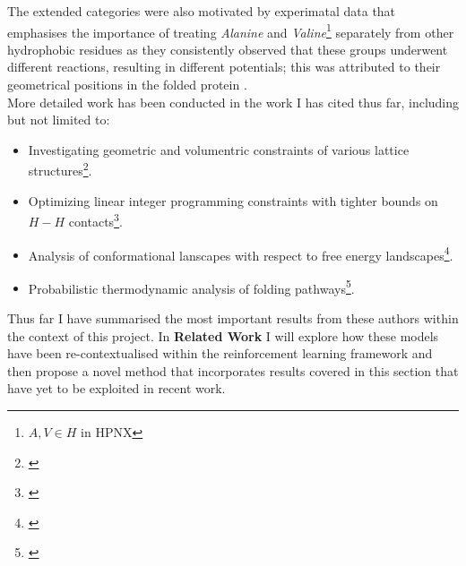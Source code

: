The extended categories were also motivated by experimatal data that
emphasises the importance of treating \emph{Alanine} and \emph{Valine}\footnote{$A, V \in H$ in HPNX}
separately from other hydrophobic residues as they consistently observed
that these groups underwent different reactions, resulting in different potentials;
this was attributed to their geometrical positions in the folded protein \cite{Crippen1991}.\\

More detailed work has been conducted in the work I has cited thus far,
including but not limited to:
\begin{itemize}
    \item Investigating geometric and volumentric constraints of various lattice structures\footnote{\cite{Yue,Dill}}.
    \item Optimizing linear integer programming constraints with tighter bounds on $H-H$ contacts\footnote{\cite{Yue}}.
    \item Analysis of conformational lanscapes with respect to free energy landscapes\footnote{\cite{Dill}}.
    \item Probabilistic thermodynamic analysis of folding pathways\footnote{\cite{Yang,Dill}}.
\end{itemize}

Thus far I have summarised the most important results from these authors within the context of this project.
In \textbf{Related Work} I will explore how these models have been re-contextualised within the
reinforcement learning framework and then propose a novel method that incorporates results
covered in this section that have yet to be exploited in recent work.